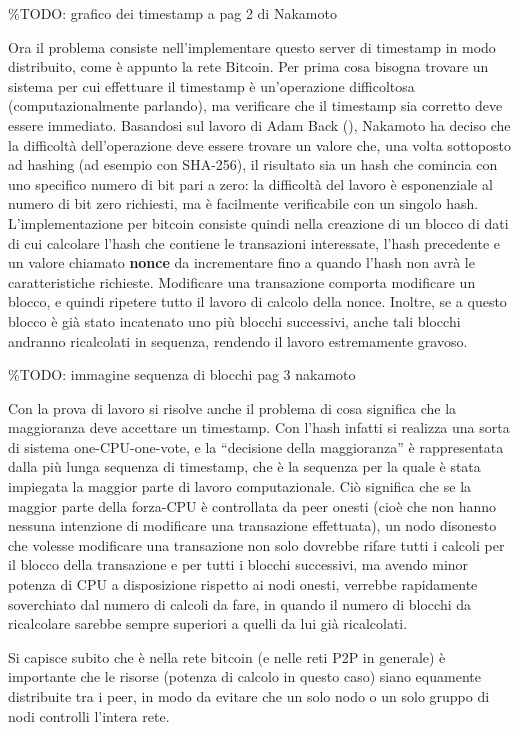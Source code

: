 \%TODO: grafico dei timestamp a pag 2 di Nakamoto

Ora il problema consiste nell'implementare questo server di timestamp in
modo distribuito, come è appunto la rete Bitcoin. Per prima cosa bisogna
trovare un sistema per cui effettuare il timestamp è un'operazione
difficoltosa (computazionalmente parlando), ma verificare che il
timestamp sia corretto deve essere immediato. Basandosi sul lavoro di
Adam Back (\cite{hashcash}), Nakamoto ha deciso che la difficoltà
dell'operazione deve essere trovare un valore che, una volta sottoposto
ad hashing (ad esempio con SHA-256), il risultato sia un hash che
comincia con uno specifico numero di bit pari a zero: la difficoltà del
lavoro è esponenziale al numero di bit zero richiesti, ma è facilmente
verificabile con un singolo hash. L'implementazione per bitcoin consiste
quindi nella creazione di un blocco di dati di cui calcolare l'hash che
contiene le transazioni interessate, l'hash precedente e un valore
chiamato \textbf{nonce} da incrementare fino a quando l'hash non avrà le
caratteristiche richieste. Modificare una transazione comporta
modificare un blocco, e quindi ripetere tutto il lavoro di calcolo della
nonce. Inoltre, se a questo blocco è già stato incatenato uno più
blocchi successivi, anche tali blocchi andranno ricalcolati in sequenza,
rendendo il lavoro estremamente gravoso.

\%TODO: immagine sequenza di blocchi pag 3 nakamoto

Con la prova di lavoro si risolve anche il problema di cosa significa
che la maggioranza deve accettare un timestamp. Con l'hash infatti si
realizza una sorta di sistema one-CPU-one-vote, e la ``decisione della
maggioranza'' è rappresentata dalla più lunga sequenza di timestamp, che
è la sequenza per la quale è stata impiegata la maggior parte di lavoro
computazionale. Ciò significa che se la maggior parte della forza-CPU è
controllata da peer onesti (cioè che non hanno nessuna intenzione di
modificare una transazione effettuata), un nodo disonesto che volesse
modificare una transazione non solo dovrebbe rifare tutti i calcoli per
il blocco della transazione e per tutti i blocchi successivi, ma avendo
minor potenza di CPU a disposizione rispetto ai nodi onesti, verrebbe
rapidamente soverchiato dal numero di calcoli da fare, in quando il
numero di blocchi da ricalcolare sarebbe sempre superiori a quelli da
lui già ricalcolati.

Si capisce subito che è nella rete bitcoin (e nelle reti P2P in
generale) è importante che le risorse (potenza di calcolo in questo
caso) siano equamente distribuite tra i peer, in modo da evitare che un
solo nodo o un solo gruppo di nodi controlli l'intera rete.

